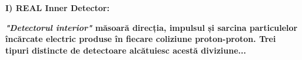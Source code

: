 \documentclass{beamer}
\begin{document}
\begin{frame}{\textbf{I) REAL Inner Detector:}}
 

 \small
 
\vspace{-4cm}

\textbf{ \makebox[0.5cm]{}\textit{"Detectorul interior"} măsoară direcția, impulsul și sarcina particulelor încărcate electric produse în fiecare coliziune proton-proton. Trei tipuri distincte de detectoare alcătuiesc acestă diviziune...}

\end{frame}
\end{document}
